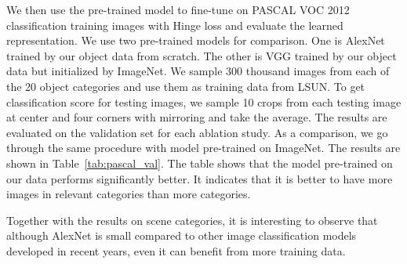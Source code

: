 We then use the pre-trained model to fine-tune on
PASCAL VOC 2012 classification training images with Hinge loss and
evaluate the learned representation. We use two pre-trained models for
comparison. One is AlexNet trained by our object data from
scratch. The other is VGG trained by our object data but initialized
by ImageNet. We sample 300 thousand images
from each of the 20 object categories and use them as training data
from LSUN. To get classification score for
testing images, we sample 10
crops from each testing image at center and four corners with mirroring
and take the average. The results are evaluated on the validation
set for each ablation study. As a comparison, we go through the
same procedure with model pre-trained on ImageNet. The results are
shown in Table~\ref{tab:pascal_val}. The table shows that the model
pre-trained on our data performs significantly better. It indicates
that it is better to have more images in relevant categories than more
categories.

Together with the results on scene categories, it is
interesting to observe that although AlexNet is small compared to
other image classification models developed in recent years, even it
can benefit from more training data.

